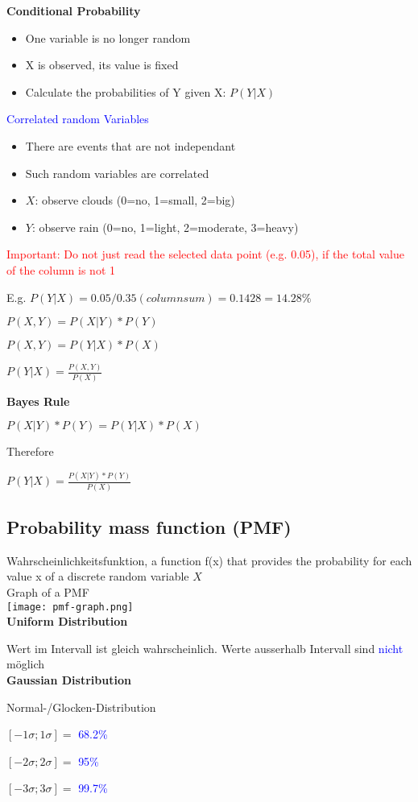 \textbf{Conditional Probability}
\begin{itemize}
    \item One variable is no longer random
    \item X is observed, its value is fixed
    \item Calculate the probabilities of Y given X: $P(Y | X)$
\end{itemize}
\vspace{10pt}
\textcolor{blue}{Correlated random Variables}
\begin{itemize}
    \item There are events that are not independant
    \item Such random variables are correlated
    \item $X$: observe clouds (0=no, 1=small, 2=big)
    \item $Y$: observe rain (0=no, 1=light, 2=moderate, 3=heavy)
\end{itemize}
\vspace{10pt}
\textcolor{red}{Important: Do not just read the selected data point (e.g. 0.05), if the total value of the column is not 1}

E.g. $P(Y | X) = 0.05 / 0.35 (column sum) = 0.1428 = 14.28\%$ \\

\begin{center}
    $P(X, Y) = P(X | Y) * P(Y)$

    $P(X, Y) = P(Y | X) * P(X)$

    $P(Y | X) = \frac{P(X,Y)}{P(X)}$
\end{center}
\vspace{10pt}
\textbf{Bayes Rule}

$P(X|Y)*P(Y) = P(Y|X)*P(X)$

Therefore

$P(Y|X) = \frac{P(X|Y)*P(Y)}{P(X)}$


\subsection{Probability mass function (PMF)}
Wahrscheinlichkeitsfunktion, a function f(x) that provides the probability for each value x of a discrete random
variable $X$ \\

Graph of a PMF \\
\texttt{[image: pmf-graph.png]} \\

\textbf{Uniform Distribution}

Wert im Intervall ist gleich wahrscheinlich. Werte ausserhalb Intervall sind \textcolor{blue}{nicht} möglich \\


\textbf{Gaussian Distribution}

Normal-/Glocken-Distribution

$[-1\sigma; 1\sigma] =$ \textcolor{blue}{68.2\%}

$[-2\sigma; 2\sigma] =$ \textcolor{blue}{95\%}

$[-3\sigma; 3\sigma] =$ \textcolor{blue}{99.7\%}
